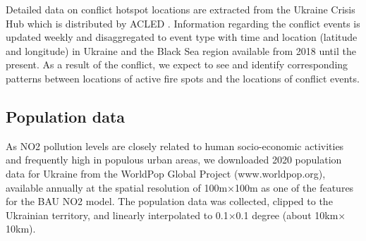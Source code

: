 Detailed data on conflict hotspot locations are extracted from the Ukraine Crisis Hub which is distributed by ACLED \citep{raleigh2010introducing}. Information regarding the conflict events is updated weekly and disaggregated to event type with time and location (latitude and longitude) in Ukraine and the Black Sea region available from 2018 until the present. As a result of the conflict, we expect to see and identify corresponding patterns between locations of active fire spots and the locations of conflict events. \par
\subsection{Population data}
As NO2 pollution levels are closely related to human socio-economic activities and frequently high in populous urban areas, we downloaded 2020 population data for Ukraine from the WorldPop Global Project (www.worldpop.org), available annually at the spatial resolution of 100m$\times$100m as one of the features for the BAU NO2 model. The population data was collected, clipped to the Ukrainian territory, and linearly interpolated to 0.1$\times$0.1 degree (about 10km$\times$10km).\par
